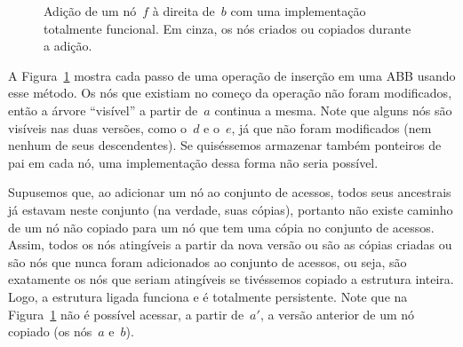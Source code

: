 \documentclass[main.tex]{subfiles}
\begin{document}
\begin{figure}
	\centering
	\caption{Adição de um nó~$f$ à direita de~$b$ com uma implementação totalmente funcional. Em cinza, os nós criados ou copiados durante a adição.} \label{fig:totfunc_ex}
\end{figure}

A Figura~\ref{fig:totfunc_ex} mostra cada passo de uma operação de inserção em uma ABB usando esse método. Os nós que existiam no começo da operação não foram modificados, então a árvore ``visível'' a partir de~$a$ continua a mesma. Note que alguns nós são visíveis nas duas versões, como o~$d$ e o~$e$, já que não foram modificados (nem nenhum de seus descendentes). Se quiséssemos armazenar também ponteiros de pai em cada nó, uma implementação dessa forma não seria possível.

Supusemos que, ao adicionar um nó ao conjunto de acessos, todos seus ancestrais já estavam neste conjunto (na verdade, suas cópias), portanto não existe caminho de um nó não copiado para um nó que tem uma cópia no conjunto de acessos. Assim, todos os nós atingíveis a partir da nova versão ou são as cópias criadas ou são nós que nunca foram adicionados ao conjunto de acessos, ou seja, são exatamente os nós que seriam atingíveis se tivéssemos copiado a estrutura inteira. Logo, a estrutura ligada funciona e é totalmente persistente. Note que na Figura~\ref{fig:totfunc_ex} não é possível acessar, a partir de~$a'$, a versão anterior de um nó copiado (os nós~$a$ e~$b$).
\end{document}
